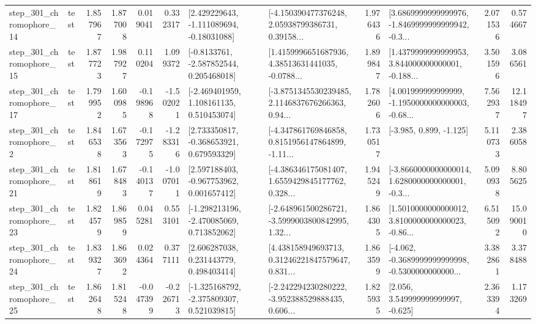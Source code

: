 \begin{tabular}{llrrrrllrlrr}
  step\_301\_chromophore\_14 &      test &      1.857967 &    1.877008 &      0.019041 &  0.332317 &    [2.429229643, -1.111089694, -0.18031088] &  [-4.150390477376248, 2.05938799386731, 0.39158... &       1.976436 &  [3.6869999999999976, -1.8469999999999942, -0.3... &            2.071536 &          0.574667 \\
  step\_301\_chromophore\_15 &      test &      1.877723 &    1.987927 &      0.110204 &  1.099372 &     [-0.8133761, -2.587852544, 0.205468018] &  [1.4159996651687936, 4.38513631441035, -0.0788... &       1.899847 &  [1.4379999999999953, 3.844000000000001, -0.188... &            3.501596 &          3.086561 \\
  step\_301\_chromophore\_17 &      test &      1.799952 &    1.600985 &     -0.198968 & -1.502021 &    [-2.469401959, 1.108161135, 0.510453074] &  [-3.8751345530239485, 2.1146837676266363, 0.94... &       1.782606 &  [4.001999999999999, -1.1950000000000003, -0.68... &            7.562937 &         12.118497 \\
   step\_301\_chromophore\_2 &      test &      1.846538 &    1.673563 &     -0.172975 & -1.283316 &    [2.733350817, -0.368653921, 0.679593329] &  [-4.347861769846858, 0.8151956147864899, -1.11... &       1.730517 &                            [-3.985, 0.899, -1.125] &            5.110733 &          2.386058 \\
  step\_301\_chromophore\_21 &      test &      1.818619 &    1.678483 &     -0.140137 & -1.007011 &    [2.597188403, -0.967753962, 0.001657412] &  [-4.386346175081407, 1.6559429845177762, 0.328... &       1.945249 &  [-3.8660000000000014, 1.6280000000000001, -0.3... &            5.090938 &          8.805625 \\
  step\_301\_chromophore\_23 &      test &      1.824579 &    1.869859 &      0.045281 &  0.553101 &   [-1.298213196, -2.470085069, 0.713852062] &  [-2.648961500286721, -3.5999003800842995, 1.32... &       1.864305 &  [1.5010000000000012, 3.8100000000000023, -0.86... &            6.515092 &         15.090010 \\
  step\_301\_chromophore\_24 &      test &      1.839327 &    1.863692 &      0.024364 &  0.377111 &     [2.606287038, 0.231443779, 0.498403414] &  [4.438158949693713, 0.31246221847579647, 0.831... &       1.863599 &  [-4.062, -0.3689999999999998, -0.5300000000000... &            3.382861 &          3.378488 \\
  step\_301\_chromophore\_25 &      test &      1.862648 &    1.815248 &     -0.047399 & -0.226713 &   [-1.325168792, -2.375809307, 0.521039815] &  [-2.242294230280222, -3.952388529888435, 0.606... &       1.825935 &                 [2.056, 3.549999999999997, -0.625] &            2.363394 &          1.173269 \\

\end{tabular}

